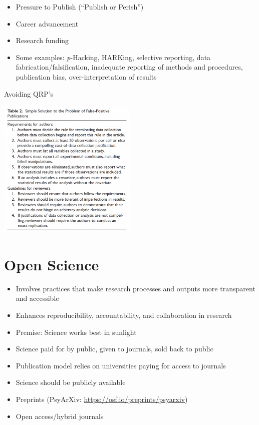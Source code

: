 \documentclass[
  ignorenonframetext,
  aspectratio=169,
]{beamer}
\providecommand{\tightlist}{%
  \setlength{\itemsep}{0pt}\setlength{\parskip}{0pt}}\usepackage{longtable,booktabs,array}
\begin{document}
\begin{frame}{}
\label{section}
\begin{itemize}[<+->]
\tightlist
\item
  Pressure to Publish (``Publish or Perish'')
\item
  Career advancement
\item
  Research funding
\item
  Some examples: \emph{p}-Hacking, HARKing, selective reporting, data
  fabrication/falsification, inadequate reporting of methods and
  procedures, publication bias, over-interpretation of results
\end{itemize}
\end{frame}

\begin{frame}{Avoiding QRP's}
\label{avoiding-qrps}
\begin{center}
\includegraphics[width=0.5\textwidth,height=\textheight]{figs/avoid-qrp.png}
\end{center}
\end{frame}

\section{Open Science}\label{open-science}

\begin{frame}{}
\label{section-1}
\begin{itemize}[<+->]
\tightlist
\item
  Involves practices that make research processes and outputs more
  transparent and accessible
\item
  Enhances reproducibility, accountability, and collaboration in
  research
\item
  Premise: Science works best in sunlight
\item
  Science paid for by public, given to journals, sold back to public
\item
  Publication model relies on universities paying for access to journals
\item
  Science should be publicly available
\item
  Preprints (PsyArXiv: \url{https://osf.io/preprints/psyarxiv})
\item
  Open access/hybrid journals
\end{itemize}
\end{frame}
\end{document}
